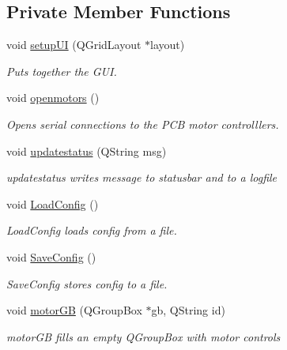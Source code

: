 \subsection*{Private Member Functions}
\begin{DoxyCompactItemize}
\item 
\mbox{\label{classcagecontrol_a79a089c4e7196a7c158aa62f4883ba18}} 
void \hyperlink{classcagecontrol_a79a089c4e7196a7c158aa62f4883ba18}{setup\+UI} (Q\+Grid\+Layout $\ast$layout)
\begin{DoxyCompactList}\small\item\em Puts together the G\+UI. \end{DoxyCompactList}\item 
\mbox{\label{classcagecontrol_ae961f42ea421a8d512964f158b0201e8}} 
void \hyperlink{classcagecontrol_ae961f42ea421a8d512964f158b0201e8}{openmotors} ()
\begin{DoxyCompactList}\small\item\em Opens serial connections to the P\+CB motor controlllers. \end{DoxyCompactList}\item 
void \hyperlink{classcagecontrol_aab3dedc2c4b814569988c93bd30546c7}{updatestatus} (Q\+String msg)
\begin{DoxyCompactList}\small\item\em updatestatus writes message to statusbar and to a logfile \end{DoxyCompactList}\item 
void \hyperlink{classcagecontrol_a0e6648cef5e6d08d638aa2472824cb6b}{Load\+Config} ()
\begin{DoxyCompactList}\small\item\em Load\+Config loads config from a file. \end{DoxyCompactList}\item 
void \hyperlink{classcagecontrol_a217d948983c0d1c153d29c728b06d764}{Save\+Config} ()
\begin{DoxyCompactList}\small\item\em Save\+Config stores config to a file. \end{DoxyCompactList}\item 
void \hyperlink{classcagecontrol_a2fd60ea2aa138472e3714dbd25cadc55}{motor\+GB} (Q\+Group\+Box $\ast$gb, Q\+String id)
\begin{DoxyCompactList}\small\item\em motor\+GB fills an empty Q\+Group\+Box with motor controls \end{DoxyCompactList}\item 

\end{DoxyCompactItemize}
